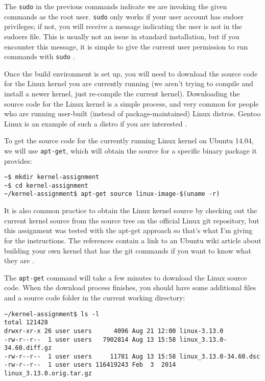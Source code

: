 \documentclass[11pt]{article}
\begin{document}
The \texttt{sudo} in the previous commands indicate we are invoking the given commands as the root user. \texttt{sudo} only works if your user account has sudoer privileges; if not, you will receive a message indicating the user is not in the sudoers file. This is usually not an issue in standard installation, but if you encounter this message, it is simple to give the current user permission to run commands with \texttt{sudo} \cite{sudoers}.

Once the build environment is set up, you will need to download the source code for the Linux kernel you are currently running (we aren't trying to compile and install a newer kernel, just re-compile the current kernel). Downloading the source code for the Linux kernel is a simple process, and very common for people who are running user-built (instead of package-maintained) Linux distros. Gentoo Linux is an example of such a distro if you are interested \cite{gentoo}.

To get the source code for the currently running Linux kernel on Ubuntu 14.04, we will use \texttt{apt-get}, which will obtain the source for a specific binary package it provides: 

\begin{verbatim}
~$ mkdir kernel-assignment
~$ cd kernel-assignment
~/kernel-assignment$ apt-get source linux-image-$(uname -r)
\end{verbatim}

It is also common practice to obtain the Linux kernel source by checking out the current kernel source from the source tree on the official Linux git repository, but this assignment was tested with the apt-get approach so that's what I'm giving for the instructions. The references contain a link to an Ubuntu wiki article about building your own kernel that has the git commands if you want to know what they are \cite{ubuntukernel}.

The \texttt{apt-get} command will take a few minutes to download the Linux source code. When the download process finishes, you should have some additional files and a source code folder in the current working directory:

\begin{verbatim}
~/kernel-assignment$ ls -l
total 121428
drwxr-xr-x 26 user users      4096 Aug 21 12:00 linux-3.13.0
-rw-r--r--  1 user users   7902814 Aug 13 15:58 linux_3.13.0-34.60.diff.gz
-rw-r--r--  1 user users     11781 Aug 13 15:58 linux_3.13.0-34.60.dsc
-rw-r--r--  1 user users 116419243 Feb  3  2014 linux_3.13.0.orig.tar.gz
\end{verbatim}
\end{document}

